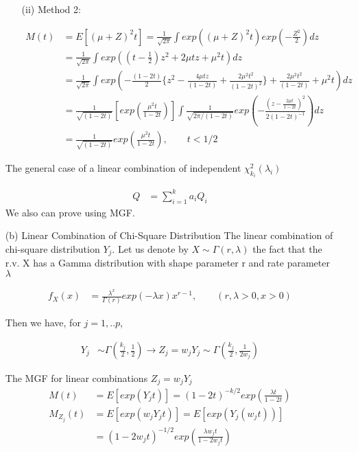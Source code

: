 \begin{itemize}
\begin{itemize}
	\item[(ii)] Method 2:
	
	\begin{align*}
	M(t) &= E[(\mu + Z)^2 t] = \frac{1}{\sqrt{2\pi}} \int exp \left((\mu + Z)^2 t \right) exp \left( - \frac{Z^2}{2} \right) dz\\
	&=  \frac{1}{\sqrt{2\pi}}  \int exp \left( (t- \frac{1}{2}) z^2 + 2\mu t z + \mu^2 t \right) dz \\
	&=  \frac{1}{\sqrt{2\pi}}  \int exp \left(  -\frac{(1-2t)}{2} \{ z^2 - \frac{4 \mu t z}{(1-2t)} + \frac{2 \mu^2 t^2}{(1-2t)^2} \} + \frac{2 \mu^2 t^2}{(1-2t)} + \mu^2 t   \right) dz \\
	&= \frac{1}{\sqrt{(1-2t)}} \left[exp \left( \frac{\mu^2 t}{1-2t} \right) \right] \int \frac{1}{\sqrt{2\pi/(1-2t)}} exp\left( -\frac{(z-\frac{2 \mu t}{1-2t})^2}{2 (1-2t)^{-1}} \right) dz \\
	&=\frac{1}{\sqrt{(1-2t)}} exp \left( \frac{\mu^2 t}{1-2t} \right), \qquad t<1/2
\end{align*}


\end{itemize}

The general case of a linear combination of independent $\chi^2_{k_i}(\lambda_i)$

\begin{align*}
	Q &= \sum_{i=1}^k a_i Q_i
\end{align*}
We also can prove using MGF.


\item[(b)] Linear Combination of Chi-Square Distribution
The linear combination of chi-square distribution $Y_j$. Let us denote by $X \sim \Gamma(r, \lambda)$ the fact that the r.v. X has a Gamma distribution with shape parameter r and rate parameter $\lambda$ 

\begin{align*}
	f_{X}(x) &= \frac{\lambda^x}{\Gamma (r)} exp(- \lambda x) x^{r-1}, \qquad (r, \lambda >0, x >0)
\end{align*}

Then we have, for $j=1,..p$,

\begin{align*}
	Y_j & \sim  \Gamma(\frac{k_j}{2}, \frac{1}{2}) \rightarrow Z_j = w_j Y_j \sim \Gamma(\frac{k_j}{2}, \frac{1}{2w_j})
\end{align*}

The MGF for linear combinations $Z_j = w_j Y_j$
\begin{align*}
	M(t) &= E[exp(Y_j t)] = (1-2t)^{-k/2} exp \left( \frac{ \lambda t }{1-2t} \right)\\
	M_{Z_j} (t) & = E[exp(w_j Y_j t)] = E[exp( Y_j (w_jt))] \\
	&= (1-2 w_jt)^{-1/2} exp \left( \frac{ \lambda w_j t }{1-2 w_j t} \right)
\end{align*}


\end{itemize}
